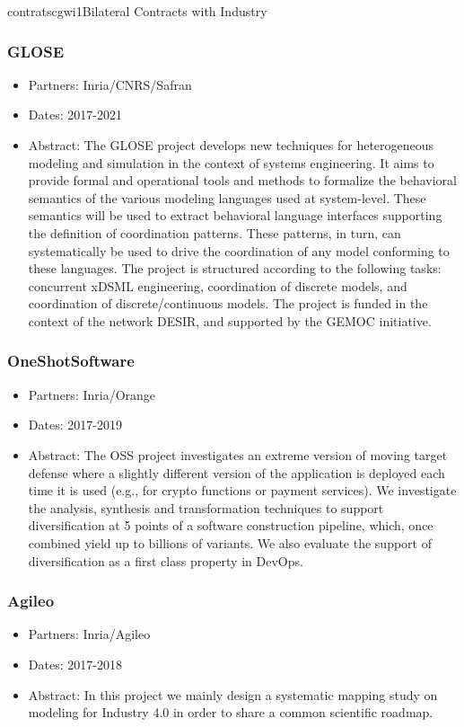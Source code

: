 \documentclass{ra2018}
\begin{document}
\begin{module}{contrats}{cgwi1}{Bilateral Contracts with Industry}
\subsubsection*{GLOSE}
\begin{itemize}
	\item Partners: Inria/CNRS/Safran
	\item Dates: 2017-2021
	\item Abstract: The GLOSE project develops new techniques for heterogeneous modeling and simulation in the context of systems engineering. It aims to provide formal and operational tools and methods to formalize the behavioral semantics of the various modeling languages used at system-level. These semantics will be used to extract behavioral language interfaces supporting the definition of coordination patterns. These patterns, in turn, can systematically be used to drive the coordination of any model conforming to these languages. The project is structured according to the following tasks: concurrent xDSML engineering, coordination of discrete models, and coordination of discrete/continuous models. The project is funded in the context of the network DESIR, and supported by the GEMOC initiative.
\end{itemize}

\subsubsection*{OneShotSoftware}
\begin{itemize}
	\item Partners: Inria/Orange
	\item Dates: 2017-2019
	\item Abstract: The OSS project investigates an extreme version of moving target defense where a slightly different version of the application is deployed each time it is used (e.g., for crypto functions or payment services). We investigate the analysis, synthesis and transformation techniques to support diversification at 5 points of a software construction pipeline, which, once combined yield up to billions of variants. We also evaluate the support of diversification as a first class property in DevOps.
\end{itemize}


\subsubsection*{Agileo}
\begin{itemize}
	\item Partners: Inria/Agileo
	\item Dates: 2017-2018
	\item Abstract: In this project we mainly design a systematic mapping study on modeling for Industry 4.0 in order to share a common scientific roadmap. 
\end{itemize}

\end{module}
\end{document}
